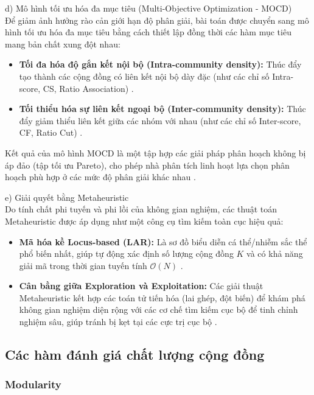 \documentclass[14pt,a4paper]{extarticle}
\begin{document}
\noindent d) Mô hình tối ưu hóa đa mục tiêu (Multi-Objective Optimization - MOCD)
\\ \indent
Để giảm ảnh hưởng rào cản giới hạn độ phân giải, bài toán được chuyển sang mô hình tối ưu hóa đa mục tiêu bằng cách thiết lập đồng thời các hàm mục tiêu mang bản chất xung đột nhau:
\begin{itemize}
    \item \textbf{Tối đa hóa độ gắn kết nội bộ (Intra-community density):} Thúc đẩy tạo thành các cộng đồng có liên kết nội bộ dày đặc (như các chỉ số Intra-score, CS, Ratio Association) \cite{Baraa2021}.
    \item \textbf{Tối thiểu hóa sự liên kết ngoại bộ (Inter-community density):} Thúc đẩy giảm thiểu liên kết giữa các nhóm với nhau (như các chỉ số Inter-score, CF, Ratio Cut) \cite{Baraa2021}.
\end{itemize}
Kết quả của mô hình MOCD là một tập hợp các giải pháp phân hoạch không bị áp đảo (tập tối ưu Pareto), cho phép nhà phân tích linh hoạt lựa chọn phân hoạch phù hợp ở các mức độ phân giải khác nhau \cite{Gong2016}.

\noindent e) Giải quyết bằng Metaheuristic
\\ \indent
Do tính chất phi tuyến và phi lồi của không gian nghiệm, các thuật toán Metaheuristic được áp dụng như một công cụ tìm kiếm toàn cục hiệu quả:
\begin{itemize}
    \item \textbf{Mã hóa kề Locus-based (LAR):} Là sơ đồ biểu diễn cá thể/nhiễm sắc thể phổ biến nhất, giúp tự động xác định số lượng cộng đồng $K$ và có khả năng giải mã trong thời gian tuyến tính $\mathcal{O}(N)$ \cite{Pizzuti2008, Baraa2021, Pourabbasi2022, Beldi2025}.
    \item \textbf{Cân bằng giữa Exploration và Exploitation:} Các giải thuật Metaheuristic kết hợp các toán tử tiến hóa (lai ghép, đột biến) để khám phá không gian nghiệm diện rộng với các cơ chế tìm kiếm cục bộ để tinh chỉnh nghiệm sâu, giúp tránh bị kẹt tại các cực trị cục bộ \cite{Baraa2021}.
\end{itemize}

\subsection{Các hàm đánh giá chất lượng cộng đồng}

\subsubsection{Modularity}
\end{document}
